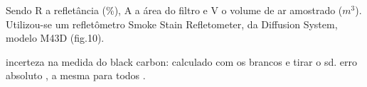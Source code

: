 
Sendo R a refletância (\%), A a área do filtro e V o volume de ar amostrado ($m^3$). 
Utilizou-se um refletômetro Smoke Stain Refletometer, da Diffusion System, modelo M43D (fig.10).

incerteza na medida do black carbon: calculado com os brancos e tirar o sd. 
erro absoluto , a mesma para todos .

